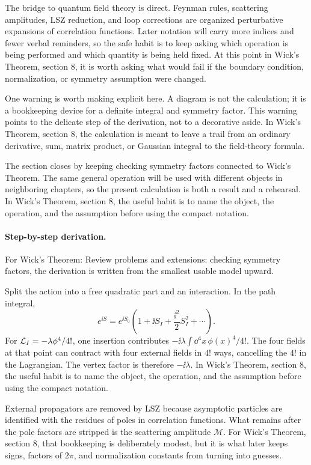 The bridge to quantum field theory is direct.  Feynman rules, scattering amplitudes, LSZ reduction, and loop corrections are organized perturbative expansions of correlation functions.  Later notation will carry more indices and fewer verbal reminders, so the safe habit is to keep asking which operation is being performed and which quantity is being held fixed.  At this point in Wick's Theorem, section 8, it is worth asking what would fail if the boundary condition, normalization, or symmetry assumption were changed.

One warning is worth making explicit here.  A diagram is not the calculation; it is a bookkeeping device for a definite integral and symmetry factor.  This warning points to the delicate step of the derivation, not to a decorative aside.  In Wick's Theorem, section 8, the calculation is meant to leave a trail from an ordinary derivative, sum, matrix product, or Gaussian integral to the field-theory formula.

The section closes by keeping checking symmetry factors connected to Wick's Theorem.  The same general operation will be used with different objects in neighboring chapters, so the present calculation is both a result and a rehearsal.  In Wick's Theorem, section 8, the useful habit is to name the object, the operation, and the assumption before using the compact notation.



\paragraph{Step-by-step derivation.}

For Wick's Theorem: Review problems and extensions: checking symmetry factors, the derivation is written from the smallest usable model upward.

Split the action into a free quadratic part and an interaction.  In the path integral,
\[
  e^{\ii S}=e^{\ii S_0}\left(1+\ii S_I+\frac{\ii^2}{2}S_I^2+\cdots\right).
\]
For \(\mathcal L_I=-\lambda\phi^4/4!\), one insertion contributes \(-\ii\lambda\int\dd^4x\,\phi(x)^4/4!\).  The four fields at that point can contract with four external fields in \(4!\) ways, cancelling the \(4!\) in the Lagrangian.  The vertex factor is therefore \(-\ii\lambda\).  In Wick's Theorem, section 8, the useful habit is to name the object, the operation, and the assumption before using the compact notation.

External propagators are removed by LSZ because asymptotic particles are identified with the residues of poles in correlation functions.  What remains after the pole factors are stripped is the scattering amplitude \(\mathcal M\).  For Wick's Theorem, section 8, that bookkeeping is deliberately modest, but it is what later keeps signs, factors of \(2\pi\), and normalization constants from turning into guesses.

